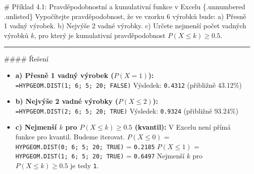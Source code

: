 \documentclass[
  czech,
  11pt,
  letterpaper,
  DIV=11,
  numbers=noendperiod]{scrreprt}
\begin{document}
\begin{tcolorbox}[enhanced jigsaw, arc=.35mm, bottomrule=.15mm, bottomtitle=1mm, breakable, colback=white, colbacktitle=quarto-callout-note-color!10!white, colframe=quarto-callout-note-color-frame, coltitle=black, left=2mm, leftrule=.75mm, opacityback=0, opacitybacktitle=0.6, rightrule=.15mm, title=\textcolor{quarto-callout-note-color}{\faInfo}\hspace{0.5em}{Poznámka}, titlerule=0mm, toprule=.15mm, toptitle=1mm]

\# Příklad 4.1: Pravděpodobnostní a kumulativní funkce v Excelu
\{.unnumbered .unlisted\} Vypočítejte pravděpodobnost, že ve vzorku 6
výrobků bude: a) Přesně 1 vadný výrobek. b) Nejvýše 2 vadné výrobky. c)
Určete nejmenší počet vadných výrobků \(k\), pro který je kumulativní
pravděpodobnost \(P(X \le k) \ge 0.5\).

\begin{center}\rule{0.5\linewidth}{0.5pt}\end{center}

\#\#\#\# Řešení

\begin{itemize}
\item
  \textbf{a) Přesně 1 vadný výrobek (\(P(X=1)\)):}
  \texttt{=HYPGEOM.DIST(1;\ 6;\ 5;\ 20;\ FALSE)} Výsledek:
  \texttt{0.4312} (přibližně 43.12\%)
\item
  \textbf{b) Nejvýše 2 vadné výrobky (\(P(X \le 2)\)):}
  \texttt{=HYPGEOM.DIST(2;\ 6;\ 5;\ 20;\ TRUE)} Výsledek:
  \texttt{0.9324} (přibližně 93.24\%)
\item
  \textbf{c) Nejmenší \(k\) pro \(P(X \le k) \ge 0.5\) (kvantil):} V
  Excelu není přímá funkce pro kvantil. Budeme iterovat. \(P(X \le 0)\)
  = \texttt{HYPGEOM.DIST(0;\ 6;\ 5;\ 20;\ TRUE)} = \texttt{0.2185}
  \(P(X \le 1)\) = \texttt{HYPGEOM.DIST(1;\ 6;\ 5;\ 20;\ TRUE)} =
  \texttt{0.6497} Nejmenší \(k\) pro \(P(X \le k) \ge 0.5\) je tedy
  \texttt{1}.
\end{itemize}

\end{tcolorbox}
\end{document}
